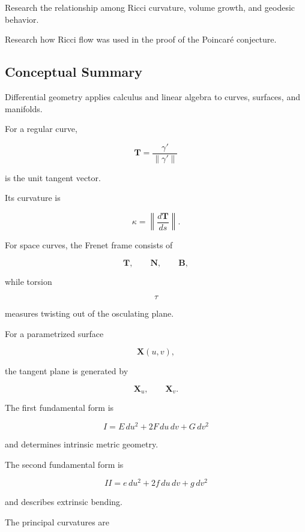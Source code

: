 \begin{exercise}[4]
Research the relationship among Ricci curvature, volume growth, and geodesic
behavior.
\end{exercise}

\begin{exercise}[4]
Research how Ricci flow was used in the proof of the Poincar\'e conjecture.
\end{exercise}

\subsection{Conceptual Summary}
\label{subsec:differential-geometry-summary}

Differential geometry applies calculus and linear algebra to curves,
surfaces, and manifolds.

For a regular curve,

\[
\boxed{
\mathbf{T}
=
\frac{\gamma'}{\|\gamma'\|}
}
\]

is the unit tangent vector.

Its curvature is

\[
\boxed{
\kappa
=
\left\|
\frac{d\mathbf{T}}{ds}
\right\|.
}
\]

For space curves, the Frenet frame consists of

\[
\boxed{
\mathbf{T},
\qquad
\mathbf{N},
\qquad
\mathbf{B},
}
\]

while torsion

\[
\boxed{\tau}
\]

measures twisting out of the osculating plane.

For a parametrized surface

\[
\mathbf{X}(u,v),
\]

the tangent plane is generated by

\[
\boxed{
\mathbf{X}_u,
\qquad
\mathbf{X}_v.
}
\]

The first fundamental form is

\[
\boxed{
I
=
E\,du^2+2F\,du\,dv+G\,dv^2
}
\]

and determines intrinsic metric geometry.

The second fundamental form is

\[
\boxed{
II
=
e\,du^2+2f\,du\,dv+g\,dv^2
}
\]

and describes extrinsic bending.

The principal curvatures are

